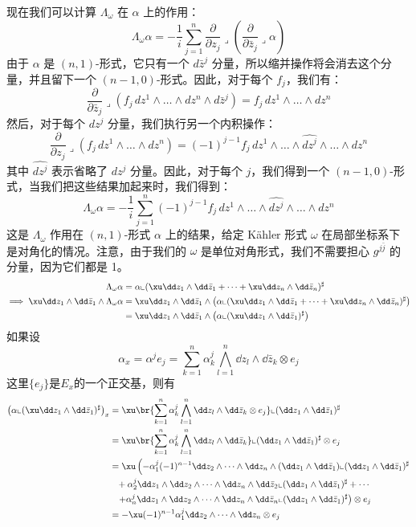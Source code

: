 现在我们可以计算 \(\Lambda_\omega\) 在 \(\alpha\) 上的作用：
\[
\Lambda_\omega \alpha = -\frac{1}{i} \sum_{j=1}^{n} \frac{\partial}{\partial z_j} \lrcorner \left( \frac{\partial}{\partial \bar{z}_j} \lrcorner \alpha \right)
\]
由于 \(\alpha\) 是 \((n,1)\)-形式，它只有一个 \(d\bar{z}^j\) 分量，所以缩并操作将会消去这个分量，并且留下一个 \((n-1,0)\)-形式。因此，对于每个 \(f_j\)，我们有：
\[
\frac{\partial}{\partial \bar{z}_j} \lrcorner (f_j \, dz^1 \wedge \ldots \wedge dz^n \wedge d\bar{z}^j) = f_j \, dz^1 \wedge \ldots \wedge dz^n
\]
然后，对于每个 \(dz^j\) 分量，我们执行另一个内积操作：
\[
\frac{\partial}{\partial z_j} \lrcorner (f_j \, dz^1 \wedge \ldots \wedge dz^n) = (-1)^{j-1} f_j \, dz^1 \wedge \ldots \wedge \widehat{dz^j} \wedge \ldots \wedge dz^n
\]
其中 \(\widehat{dz^j}\) 表示省略了 \(dz^j\) 分量。因此，对于每个 \(j\)，我们得到一个 \((n-1,0)\)-形式，当我们把这些结果加起来时，我们得到：
\[
\Lambda_\omega \alpha = -\frac{1}{i} \sum_{j=1}^{n} (-1)^{j-1} f_j \, dz^1 \wedge \ldots \wedge \widehat{dz^j} \wedge \ldots \wedge dz^n
\]
这是 \(\Lambda_\omega\) 作用在 \((n, 1)\)-形式 \(\alpha\) 上的结果，给定 Kähler 形式 \(\omega\) 在局部坐标系下是对角化的情况。注意，由于我们的 \(\omega\) 是单位对角形式，我们不需要担心 \(g^{j\bar{j}}\) 的分量，因为它们都是 1。
\begin{align*}
  \Lambda_\omega \alpha &=\alpha\llcorner (\xu \dd z_1\wedge\dd \bar{z}_1+\cdots+\xu \dd z_n\wedge\dd \bar{z}_n)^\sharp \\ 
\implies \xu \dd z_1\wedge\dd \bar{z}_1\wedge \Lambda_\omega \alpha &=\xu \dd z_1\wedge\dd \bar{z}_1\wedge \left(\alpha\llcorner (\xu \dd z_1\wedge\dd \bar{z}_1+\cdots+\xu \dd z_n\wedge\dd \bar{z}_n)^\sharp\right)\\ 
&=\xu \dd z_1\wedge\dd \bar{z}_1\wedge \left(\alpha\llcorner (\xu \dd z_1\wedge\dd \bar{z}_1)^\sharp\right)
\end{align*}
  如果设 
  \[
    \alpha_x=\alpha^j e_j=\sum_{k=1}^{n} \alpha_k^j \bigwedge_{l=1}^n \dd z_l\wedge \dd \bar{z}_k\otimes e_j
  \]
  这里$\{e_j\}$是$E_x$的一个正交基，则有
  \begin{align*}
    \left(\alpha\llcorner (\xu \dd z_1\wedge\dd \bar{z}_1)^\sharp\right)_x &=\xu \br{\sum_{k=1}^{n} \alpha_k^j \bigwedge_{l=1}^n \dd z_l\wedge \dd \bar{z}_k\otimes e_j} \llcorner (\dd z_1\wedge\dd \bar{z}_1)^\sharp\\ 
&=\xu \br{\sum_{k=1}^{n} \alpha_k^j \bigwedge_{l=1}^n \dd z_l\wedge \dd \bar{z}_k} \llcorner (\dd z_1\wedge\dd \bar{z}_1)^\sharp \otimes e_j\\ 
&=\xu \left(-\alpha_1^j (-1)^{n-1}\dd z_2\wedge \cdots\wedge\dd z_n\wedge (\dd z_1\wedge\dd \bar{z}_1)\llcorner (\dd z_1\wedge\dd \bar{z}_1)^\sharp \right.\\
&\phantom{=}+\alpha_2^j \dd z_1\wedge\dd z_2\wedge \cdots\wedge\dd z_n\wedge\dd \bar{z}_2\llcorner (\dd z_1\wedge\dd \bar{z}_1)^\sharp+\cdots\\
&\phantom{=}\left.+\alpha_n^j \dd z_1\wedge\dd z_2\wedge \cdots\wedge\dd z_n\wedge\dd \bar{z}_n\llcorner (\dd z_1\wedge\dd \bar{z}_1)^\sharp\right)\otimes e_j\\ 
&=-\xu (-1)^{n-1}\alpha_1^j \dd z_2\wedge \cdots\wedge\dd z_n \otimes e_j
  \end{align*}
